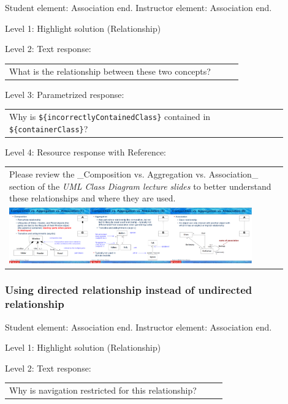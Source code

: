 Student element: Association end. Instructor element: Association end. \medskip

\noindent Level 1: Highlight solution (Relationship) \medskip

\noindent Level 2: Text response: \medskip

\begin{tabular}{|p{0.9\linewidth}}
What is the relationship between these two concepts?
\end{tabular} \medskip

\noindent Level 3: Parametrized response: \medskip

\begin{tabular}{|p{0.9\linewidth}}
Why is \verb|${incorrectlyContainedClass}| contained in \verb|${containerClass}|?
\end{tabular} \medskip

\noindent Level 4: Resource response with Reference: \medskip

\begin{tabular}{|p{0.9\linewidth}}
Please review the _Composition vs. Aggregation vs. Association_ section of 
the \textit{UML Class Diagram lecture slides} to 
better understand these relationships and where they are used.

\\
\includegraphics[width=0.9\textwidth]{images/composition_aggregation_association.png}
\end{tabular} \medskip


\subsubsection{Using directed relationship instead of undirected relationship}

Student element: Association end. Instructor element: Association end. \medskip

\noindent Level 1: Highlight solution (Relationship) \medskip

\noindent Level 2: Text response: \medskip

\begin{tabular}{|p{0.9\linewidth}}
Why is navigation restricted for this relationship?
\end{tabular} \medskip

